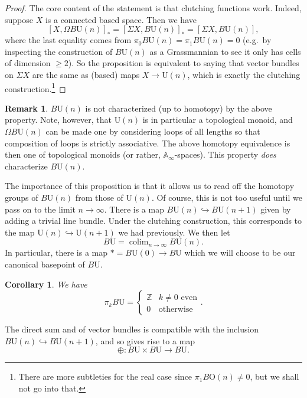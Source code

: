 \documentclass{shortart}
\newtheorem{cor}[thm]{Corollary}
\theoremstyle{definition}
\newtheorem*{remark}{Remark}
\newcommand\U{\mathrm{U}}
\newcommand\BU{B\mathrm{U}}
\newcommand\Z{\mathbb{Z}}
\newcommand\BO{B\mathrm{O}}
\DeclareMathOperator*\colim{colim}
\begin{document}
\begin{proof}
  The core content of the statement is that clutching functions work. Indeed, suppose $X$ is a connected based space. Then we have
  \[
    [X, \Omega \BU(n)]_* = [\Sigma X, \BU(n)]_* = [\Sigma X, \BU(n)],
  \]
  where the last equality comes from $\pi_0 \BU(n) = \pi_1 \BU(n) = 0$ (e.g.\ by inspecting the construction of $\BU(n)$ as a Grassmannian to see it only has cells of dimension $\geq 2$). So the proposition is equivalent to saying that vector bundles on $\Sigma X$ are the same as (based) maps $X \to \U(n)$, which is exactly the clutching construction.\footnote{There are more subtleties for the real case since $\pi_1 \BO(n) \neq 0$, but we shall not go into that.}
\end{proof}

\begin{remark}
  $\BU(n)$ is not characterized (up to homotopy) by the above property. Note, however, that $\U(n)$ is in particular a topological monoid, and $\Omega \BU(n)$ can be made one by considering loops of all lengths so that composition of loops is strictly associative. The above homotopy equivalence is then one of topological monoids (or rather, $\mathbb{A}_\infty$-spaces). This property \emph{does} characterize $\BU(n)$.
\end{remark}

The importance of this proposition is that it allows us to read off the homotopy groups of $\BU(n)$ from those of $\U(n)$. Of course, this is not too useful until we pass on to the limit $n \to \infty$. There is a map $\BU(n) \hookrightarrow \BU(n + 1)$ given by adding a trivial line bundle. Under the clutching construction, this corresponds to the map $\U(n) \hookrightarrow \U(n + 1)$ we had previously. We then let
\[
  \BU = \colim_{n \to \infty} \BU(n).
\]
In particular, there is a map $* = \BU(0) \to \BU$ which we will choose to be our canonical basepoint of $\BU$.

\begin{cor}
  We have
  \[
    \pi_k \BU = 
    \begin{cases}
      \Z & \text{$k \neq 0$ even}\\
      0 & \text{otherwise}
    \end{cases}.
  \]
\end{cor}

The direct sum and of vector bundles is compatible with the inclusion $\BU(n) \hookrightarrow \BU(n + 1)$, and so gives rise to a map
\[
  \oplus: \BU \times \BU \to \BU.
\]
\end{document}
